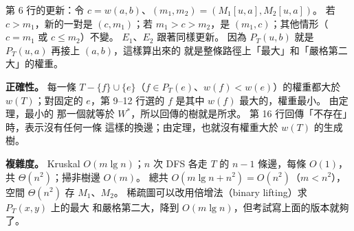 \begin{pastsoln}
第 6 行的更新：令 $c = w(a, b)$、$(m_1, m_2) = (M_1[u, a], M_2[u, a])$。 若 $c > m_1$，新的一對是
$(c, m_1)$；若 $m_1 > c > m_2$，是 $(m_1, c)$；其他情形（$c = m_1$ 或 $c \le m_2$）不變。
$E_1$、$E_2$ 跟著同樣更新。 因為 $P_T(u, b)$ 就是 $P_T(u, a)$ 再接上 $(a, b)$，這樣算出來的
就是整條路徑上「最大」和「嚴格第二大」的權重。

\textbf{正確性。} 每一條 $T - \{f\} \cup \{e\}$（$f \in P_T(e)$、$w(f) < w(e)$）的權重都大於
$w(T)$；對固定的 $e$，第 9--12 行選的 $f$ 是其中 $w(f)$ 最大的，權重最小。 由定理，最小的
那一個就等於 $W^{*}$，所以回傳的樹就是所求。 第 16 行回傳「不存在」時，表示沒有任何一條
這樣的換邊；由定理，也就沒有權重大於 $w(T)$ 的生成樹。

\textbf{複雜度。} Kruskal $O(m \lg n)$；$n$ 次 DFS 各走 $T$ 的 $n - 1$ 條邊，每條 $O(1)$，共
$\Theta(n^2)$；掃非樹邊 $O(m)$。 總共 $O(m \lg n + n^2) = O(n^2)$（$m < n^2$），空間
$\Theta(n^2)$ 存 $M_1$、$M_2$。 稀疏圖可以改用倍增法（binary lifting）求 $P_T(x, y)$ 上的最大
和嚴格第二大，降到 $O(m \lg n)$，但考試寫上面的版本就夠了。
\end{pastsoln}
